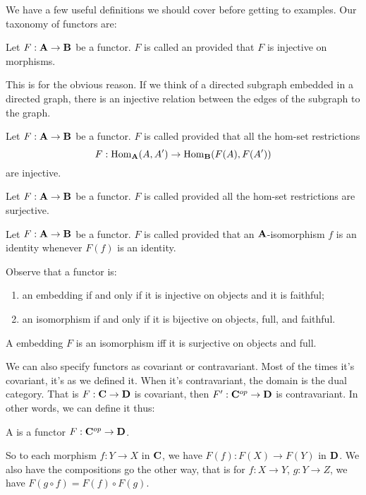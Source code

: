We have a few useful definitions we should cover before getting
to examples. Our taxonomy of functors are:
\begin{defn}%
Let $F:\mathbf{A}\to\mathbf{B}$ be a functor. $F$ is called an
 provided that $F$ is injective on morphisms.
\end{defn}
\begin{rmk}
This is for the obvious reason. If we think of a directed
subgraph embedded in a directed graph, there is an injective
relation between the edges of the subgraph to the graph.
\end{rmk}
\begin{defn}%
Let $F:\mathbf{A}\to\mathbf{B}$ be a functor. $F$ is called
 provided that all the hom-set restrictions
\begin{equation}%
F:\hom_{\ms{A}}(A,A')\to\hom_{\ms{B}}(F(A),F(A'))
\end{equation}
are injective.
\end{defn}
\begin{defn}%
Let $F:\mathbf{A}\to\mathbf{B}$ be a functor. $F$ is called 
provided all the hom-set restrictions are surjective.
\end{defn}
\begin{defn}%
Let $F:\mathbf{A}\to\mathbf{B}$ be a functor. $F$ is called
 provided that an $\mathbf{A}$-isomorphism $f$ is an
identity whenever $F(f)$ is an identity.
\end{defn}
\begin{prop}%
Observe that a functor is:
\begin{enumerate}
\item an embedding if and only if it is injective on
objects and it is faithful;
\item an isomorphism if and only if it is bijective on objects,
  full, and faithful. 
\end{enumerate}
\end{prop}
\begin{cor}
A embedding $F$ is an isomorphism iff it is surjective on objects
and full.
\end{cor}

We can also specify functors as covariant or contravariant. Most
of the times it's covariant, it's as we defined it. When it's
contravariant, the domain is the dual category. That is
$F:\mathbf{C}\to\mathbf{D}$ is covariant, then $F':\mathbf{C}^{op}\to\mathbf{D}$
is contravariant. In other words, we can define it thus:
\begin{defn}\label{defn:contravariantFunctor}
A  is
a functor $F:\mathbf{C}^{op}\to\mathbf{D}$.
\end{defn}
So to each morphism $f:Y\to X$  in $\mathbf{C}$, we have
$F(f):F(X)\to F(Y)$ in $\mathbf{D}$. We also have the compositions go
the other way, that is for $f:X\to Y$, $g:Y\to Z$, we have
$F(g\circ f)=F(f)\circ F(g)$.

